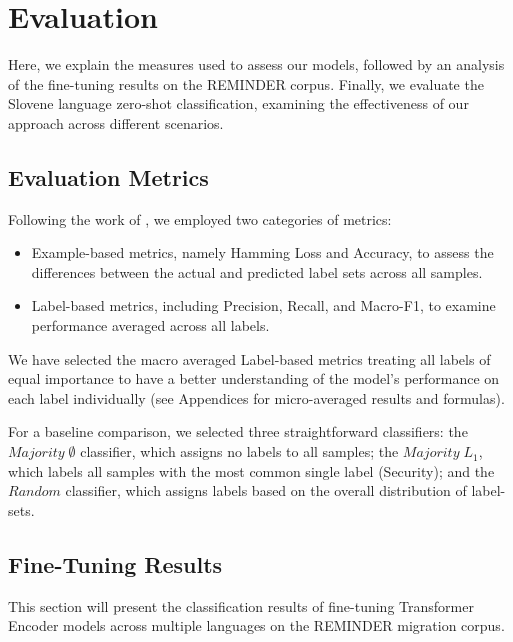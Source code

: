 \documentclass[10pt, a4paper]{article}
\begin{document}
\section{Evaluation}
\label{sec:evaluation}
Here, we explain the measures used to assess our models, followed by an analysis of the fine-tuning results on the REMINDER corpus. 
Finally, we evaluate the Slovene language zero-shot classification, examining the effectiveness of our approach across different scenarios.

\subsection{Evaluation Metrics}
\label{subsec:evaluation_metrics}
Following the work of \citealp{Tsoumakas2010, madjarov2012}, we employed two categories of metrics:
\begin{itemize}\itemsep=0pt
    \item Example-based metrics, namely Hamming Loss and Accuracy, to assess the differences between the actual and predicted label sets across all samples.
    \item Label-based metrics, including Precision, Recall, and Macro-F1, to examine performance averaged across all labels.
\end{itemize}
We have selected the macro averaged Label-based metrics treating all labels of equal importance to have a better understanding of the model's performance on each label individually (see Appendices for micro-averaged results and formulas).

For a baseline comparison, we selected three straightforward classifiers: the $Majority\;\emptyset$ classifier, which assigns no labels to all samples; the $Majority\; L_1$, which labels all samples with the most common single label (Security); and the $Random$ classifier, which assigns labels based on the overall distribution of label-sets.

\subsection{Fine-Tuning Results}
\label{subsec:fine_tuning_results}

This section will present the classification results of fine-tuning Transformer Encoder models across multiple languages on the REMINDER migration corpus.
\end{document}
